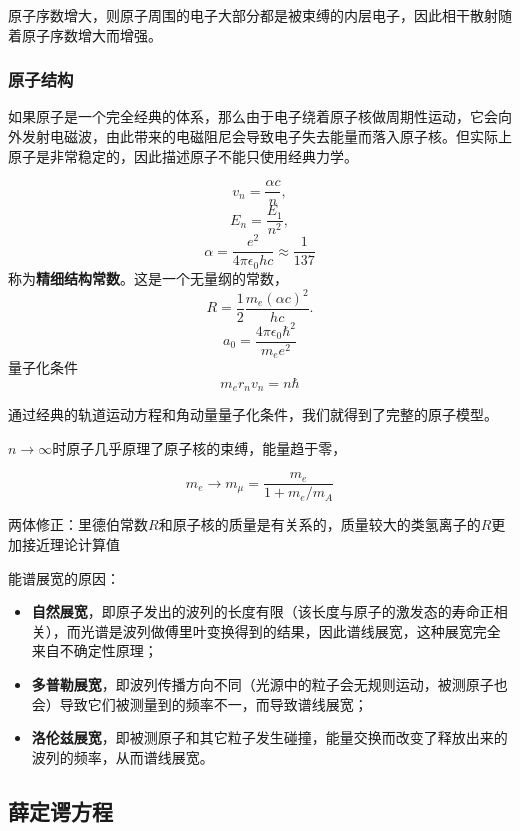 \documentclass[UTF8, a4paper]{ctexart}
\begin{document}
原子序数增大，则原子周围的电子大部分都是被束缚的内层电子，因此相干散射随着原子序数增大而增强。

\subsubsection{原子结构}

如果原子是一个完全经典的体系，那么由于电子绕着原子核做周期性运动，它会向外发射电磁波，由此带来的电磁阻尼会导致电子失去能量而落入原子核。但实际上原子是非常稳定的，因此描述原子不能只使用经典力学。

\[
    v_n = \frac{\alpha c}{n},
\]
\[
    E_n = \frac{E_1}{n^2},
\]
\begin{equation}
    \alpha = \frac{e^2}{4\pi \epsilon_0 h c} \approx \frac{1}{137}
\end{equation}
称为\textbf{精细结构常数}。这是一个无量纲的常数，
\[
    R = \frac{1}{2} \frac{m_e (\alpha c)^2}{hc}.
\]
\[
    a_0 = \frac{4\pi\epsilon_0 \hbar^2}{m_e e^2}
\]
量子化条件
\begin{equation}
    m_e r_n v_n = n \hbar
\end{equation}

通过经典的轨道运动方程和角动量量子化条件，我们就得到了完整的原子模型。

$n\to\infty$时原子几乎原理了原子核的束缚，能量趋于零，

\[
    m_e \longrightarrow m_\mu = \frac{m_e}{1 + m_e/m_A}
\]

两体修正：里德伯常数$R$和原子核的质量是有关系的，质量较大的类氢离子的$R$更加接近理论计算值

能谱展宽的原因：
\begin{itemize}
    \item \textbf{自然展宽}，即原子发出的波列的长度有限（该长度与原子的激发态的寿命正相关），而光谱是波列做傅里叶变换得到的结果，因此谱线展宽，这种展宽完全来自不确定性原理；
    \item \textbf{多普勒展宽}，即波列传播方向不同（光源中的粒子会无规则运动，被测原子也会）导致它们被测量到的频率不一，而导致谱线展宽；
    \item \textbf{洛伦兹展宽}，即被测原子和其它粒子发生碰撞，能量交换而改变了释放出来的波列的频率，从而谱线展宽。
\end{itemize}

\subsection{薛定谔方程}
\end{document}
